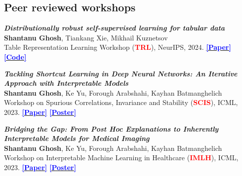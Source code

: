 \subsection{Peer reviewed workshops}
  \printbibliography[heading=none,type=article,keyword=inproceedings,
    resetnumbers=true,prefixnumbers=C]
    \begin{enumerate}[label=\texttt{[W\arabic*]}, start=3]
        \item{\textit{\textbf{Distributionally robust self-supervised learning for tabular data}}  
        \\\textbf{Shantanu Ghosh}, Tiankang Xie, Mikhail Kuznetsov
        \\Table Representation Learning Workshop 
        (\textcolor{red}{\textbf{TRL}}), NeurIPS, 2024}. 
        \href{https://openreview.net/pdf?id=71u8OvjYbZ}
        {\textbf{\textcolor{blue}{[Paper]}}}
        \href{https://github.com/amazon-science/distributionally-robust-self-supervised-learning-for-tabular-data}
        {\textbf{\textcolor{blue}{[Code]}}}

        \addtocounter{enumi}{-2}
        \item{\textit{\textbf{Tackling Shortcut Learning in Deep Neural Networks: An Iterative Approach with Interpretable Models}}  
        \\\textbf{Shantanu Ghosh}, Ke Yu, Forough Arabshahi, Kayhan Batmanghelich
        \\Workshop on Spurious Correlations, Invariance and Stability (\textcolor{red}{\textbf{SCIS}}), ICML, 2023}. 
        \href{https://arxiv.org/abs/2302.10289}
        {\textbf{\textcolor{blue}{[Paper]}}}
        \href{https://github.com/batmanlab/ICML-2023-Route-interpret-repeat/blob/main/doc/Route-Interpret-Repeat-SCIS-2023-poster_v1.pdf}
        {\textbf{\textcolor{blue}{[Poster]}}}

        \addtocounter{enumi}{-2}
        \item \textit{\textbf{Bridging the Gap: From Post Hoc Explanations to Inherently Interpretable Models for Medical Imaging}}
        \\\textbf{Shantanu Ghosh}, Ke Yu, Forough Arabshahi, Kayhan Batmanghelich 
        \\Workshop on Interpretable Machine Learning in Healthcare (\textcolor{red}{\textbf{IMLH}}), ICML, 2023.
        \href{https://openreview.net/pdf?id=sbOVNiSNY8}
        {\textbf{\textcolor{blue}{[Paper]}}}
        \href{https://github.com/batmanlab/ICML-2023-Route-interpret-repeat/blob/main/doc/Route-Interpret-Repeat-IMLH-2023-poster_v1.pdf}
        {\textbf{\textcolor{blue}{[Poster]}}}
       \end{enumerate}


       
